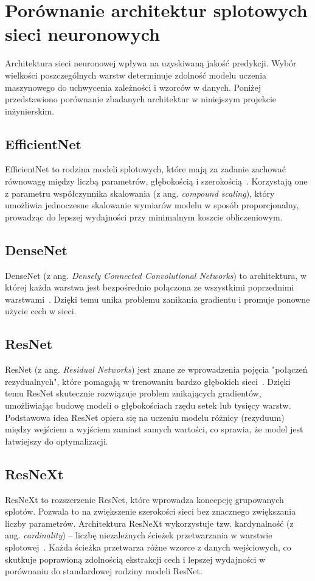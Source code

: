 \section{Porównanie architektur splotowych sieci neuronowych}

Architektura sieci neuronowej wpływa na uzyskiwaną jakość predykcji.
Wybór wielkości poszczególnych warstw determinuje zdolność modelu uczenia maszynowego do uchwycenia zależności i wzorców w danych.
Poniżej przedstawiono porównanie zbadanych architektur w niniejszym projekcie inżynierskim.

\subsection{EfficientNet}

EfficientNet to rodzina modeli splotowych, które mają za zadanie zachować równowagę między liczbą parametrów, głębokością i szerokością~\cite{efficientnet}.
Korzystają one z parametru współczynnika skalowania (z ang. \textit{compound scaling}),
który umożliwia jednoczesne skalowanie wymiarów modelu w sposób proporcjonalny, prowadząc do lepszej wydajności przy minimalnym koszcie obliczeniowym.

\subsection{DenseNet}

DenseNet (z ang. \textit{Densely Connected Convolutional Networks}) to architektura,
w której każda warstwa jest bezpośrednio połączona ze wszystkimi poprzednimi warstwami~\cite{densenet}.
Dzięki temu unika problemu zanikania gradientu i promuje ponowne użycie cech w sieci.

\subsection{ResNet}

ResNet (z ang. \textit{Residual Networks}) jest znane ze wprowadzenia pojęcia "połączeń rezydualnych", które pomagają w trenowaniu bardzo głębokich sieci~\cite{resnet}.
Dzięki temu ResNet skutecznie rozwiązuje problem znikających gradientów, umożliwiając budowę modeli o głębokościach rzędu setek lub tysięcy warstw.
Podstawowa idea ResNet opiera się na uczeniu modelu różnicy (rezyduum) między wejściem a wyjściem zamiast samych wartości, co sprawia, że model jest łatwiejszy do optymalizacji.

\subsection{ResNeXt}

ResNeXt to rozszerzenie ResNet, które wprowadza koncepcję grupowanych splotów.
Pozwala to na zwiększenie szerokości sieci bez znacznego zwiększania liczby parametrów.
Architektura ResNeXt wykorzystuje tzw.
kardynalność (z ang. \textit{cardinality}) – liczbę niezależnych ścieżek przetwarzania w warstwie splotowej~\cite{cardinality}.
Każda ścieżka przetwarza różne wzorce z danych wejściowych, co skutkuje poprawioną zdolnością ekstrakcji cech i lepszej wydajności w porównaniu do standardowej rodziny modeli ResNet.
